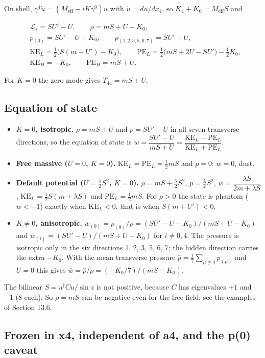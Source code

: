 \documentclass[11pt]{article}
\begin{document}
On shell, $\gamma^4\dot u=(M_{\mathrm{eff}}-iK\gamma^0)u$ with $\dot u=du/dx_4$, so $K_4+K_0=M_{\mathrm{eff}}S$ and

\[
\begin{aligned}
&\mathcal L_s=SU'-U,\qquad \rho=mS+U-K_0,\\
&p_{(0)}=SU'-U-K_0,\qquad p_{(1,2,3,5,6,7)}=SU'-U,\\
&\mathrm{KE}_L=\tfrac12\bigl(S(m+U')-K_0\bigr),\qquad \mathrm{PE}_L=\tfrac12\bigl(mS+2U-SU'\bigr)-\tfrac12K_0,\\
&\mathrm{KE}_H=-K_0,\qquad \mathrm{PE}_H=mS+U.
\end{aligned}
\]

For $K=0$ the zero mode gives $T_{44}=mS+U$.

\subsection{Equation of state}

\begin{itemize}
\item \textbf{$K=0$, isotropic.} $\rho=mS+U$ and $p=SU'-U$ in all seven transverse directions, so the equation of state is $w=\dfrac{SU'-U}{mS+U}=\dfrac{\mathrm{KE}_L-\mathrm{PE}_L}{\mathrm{KE}_L+\mathrm{PE}_L}$.
\item \textbf{Free massive ($U=0$, $K=0$).} $\mathrm{KE}_L=\mathrm{PE}_L=\tfrac12mS$ and $p=0$: $w=0$, dust.
\item \textbf{Default potential ($U=\tfrac\lambda2S^2$, $K=0$).} $\rho=mS+\tfrac\lambda2S^2$, $p=\tfrac\lambda2S^2$, $w=\dfrac{\lambda S}{2m+\lambda S}$, $\mathrm{KE}_L=\tfrac12S(m+\lambda S)$ and $\mathrm{PE}_L=\tfrac12mS$. For $\rho>0$ the state is phantom ($w<-1$) exactly when $\mathrm{KE}_L<0$, that is when $S(m+U')<0$.
\item \textbf{$K\ne0$, anisotropic.} $w_{(0)}=p_{(0)}/\rho=(SU'-U-K_0)/(mS+U-K_0)$ and $w_{(i)}=(SU'-U)/(mS+U-K_0)$ for $i\ne0,4$. The pressure is isotropic only in the six directions 1, 2, 3, 5, 6, 7; the hidden direction carries the extra $-K_0$. With the mean transverse pressure $\bar p=\tfrac17\sum_{\mu\ne4}p_{(\mu)}$ and $U=0$ this gives $\bar w=\bar p/\rho=(-K_0/7)/(mS-K_0)$.
\end{itemize}

The bilinear $S=u^\dagger Cu/\sin z$ is not positive, because $C$ has eigenvalues $+1$ and $-1$ (8 each). So $\rho=mS$ can be negative even for the free field; see the examples of Section 13.6.

\subsection{Frozen in x4, independent of a4, and the p(0) caveat}
\end{document}
